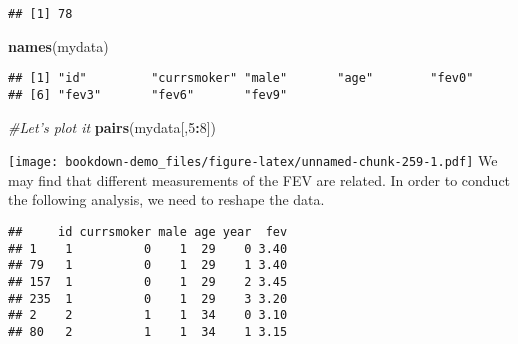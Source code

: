 \documentclass[]{book}
\newenvironment{Shaded}{\begin{snugshade}}{\end{snugshade}}
\newcommand{\KeywordTok}[1]{\textcolor[rgb]{0.13,0.29,0.53}{\textbf{#1}}}
\newcommand{\DataTypeTok}[1]{\textcolor[rgb]{0.13,0.29,0.53}{#1}}
\newcommand{\DecValTok}[1]{\textcolor[rgb]{0.00,0.00,0.81}{#1}}
\newcommand{\StringTok}[1]{\textcolor[rgb]{0.31,0.60,0.02}{#1}}
\newcommand{\CommentTok}[1]{\textcolor[rgb]{0.56,0.35,0.01}{\textit{#1}}}
\newcommand{\OperatorTok}[1]{\textcolor[rgb]{0.81,0.36,0.00}{\textbf{#1}}}
\newcommand{\NormalTok}[1]{#1}
\theoremstyle{definition}
\theoremstyle{definition}
\theoremstyle{definition}
\theoremstyle{remark}
\begin{document}
\begin{verbatim}
## [1] 78
\end{verbatim}

\begin{Shaded}
\begin{Highlighting}[]
\KeywordTok{names}\NormalTok{(mydata)}
\end{Highlighting}
\end{Shaded}

\begin{verbatim}
## [1] "id"         "currsmoker" "male"       "age"        "fev0"      
## [6] "fev3"       "fev6"       "fev9"
\end{verbatim}

\begin{Shaded}
\begin{Highlighting}[]
\CommentTok{#Let's plot it}
\KeywordTok{pairs}\NormalTok{(mydata[,}\DecValTok{5}\OperatorTok{:}\DecValTok{8}\NormalTok{])}
\end{Highlighting}
\end{Shaded}

\texttt{[image: bookdown-demo\_files/figure-latex/unnamed-chunk-259-1.pdf]}
We may find that different measurements of the FEV are related. In order
to conduct the following analysis, we need to reshape the data.

\begin{Shaded}
\end{Shaded}

\begin{verbatim}
##     id currsmoker male age year  fev
## 1    1          0    1  29    0 3.40
## 79   1          0    1  29    1 3.40
## 157  1          0    1  29    2 3.45
## 235  1          0    1  29    3 3.20
## 2    2          1    1  34    0 3.10
## 80   2          1    1  34    1 3.15
\end{verbatim}
\end{document}
